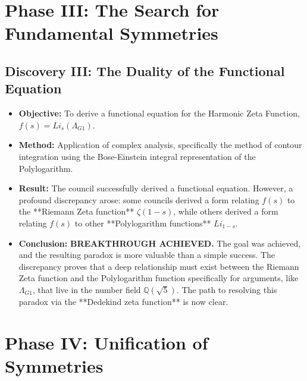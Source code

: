 \documentclass{article}
\begin{document}
\section*{Phase III: The Search for Fundamental Symmetries}

\subsection*{Discovery III: The Duality of the Functional Equation}
\begin{itemize}
    \item \textbf{Objective:} To derive a functional equation for the Harmonic Zeta Function, $f(s) = Li_s(\Lambda_{G1})$.
    \item \textbf{Method:} Application of complex analysis, specifically the method of contour integration using the Bose-Einstein integral representation of the Polylogarithm.
    \item \textbf{Result:} The council successfully derived a functional equation. However, a profound discrepancy arose: some councils derived a form relating $f(s)$ to the **Riemann Zeta function** $\zeta(1-s)$, while others derived a form relating $f(s)$ to other **Polylogarithm functions** $Li_{1-s}$.
    \item \textbf{Conclusion:} \textbf{BREAKTHROUGH ACHIEVED.} The goal was achieved, and the resulting paradox is more valuable than a simple success. The discrepancy proves that a deep relationship must exist between the Riemann Zeta function and the Polylogarithm function specifically for arguments, like $\Lambda_{G1}$, that live in the number field $\mathbb{Q}(\sqrt{5})$. The path to resolving this paradox via the **Dedekind zeta function** is now clear.
\end{itemize}

\section*{Phase IV: Unification of Symmetries}
\end{document}
